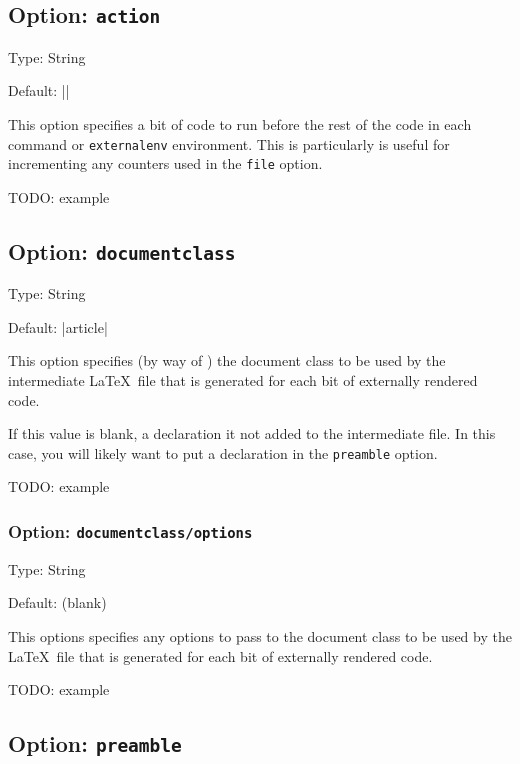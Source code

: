 \documentclass[10pt]{ltxdoc}
\newcommand{\env}[1]{\texttt{#1}}
\newcommand{\opt}[1]{\texttt{#1}}
\begin{document}
\subsection{Option: \opt{action}}
\label{subsec:action}

Type: String

Default: ||

This option specifies a bit of code to run before the rest of the code
in each  command or \env{externalenv} environment.
This is particularly is useful for incrementing any counters used in
the \opt{file} option.

TODO: example

\subsection{Option: \opt{documentclass}}
\label{subsec:documentclass}

Type: String

Default: |article|

This option specifies (by way of ) the document class
to be used by the intermediate \LaTeX\ file that is generated for each
bit of externally rendered code.

If this value is blank, a  declaration it not added
to the intermediate file.
In this case, you will likely want to put a 
declaration in the \opt{preamble} option.

TODO: example

\subsubsection{Option: \opt{documentclass/options}}
\label{subsec:documentclass/options}

Type: String

Default: (blank)

This options specifies any options to pass to the document class to be
used by the \LaTeX\ file that is generated for each bit of externally
rendered code.

TODO: example

\subsection{Option: \opt{preamble}}
\label{subsec:preamble}
\end{document}
